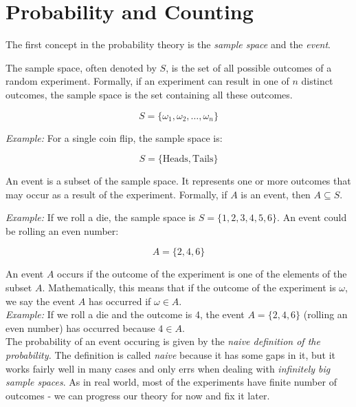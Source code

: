 \section{Probability and Counting}

The first concept in the probability theory is the \textit{sample space} and the \textit{event}. 

\begin{definition}
    The sample space, often denoted by \( S \), is the set of all possible outcomes of a random experiment. Formally, if an experiment can result in one of \( n \) distinct outcomes, the sample space is the set containing all these outcomes.

\[
S = \{ \omega_1, \omega_2, \dots, \omega_n \}
\]
\end{definition}


\textit{Example:} For a single coin flip, the sample space is:

\[
S = \{ \text{Heads}, \text{Tails} \}
\]

\begin{definition}
    An event is a subset of the sample space. It represents one or more outcomes that may occur as a result of the experiment. Formally, if \( A \) is an event, then \( A \subseteq S \).
\end{definition}

\textit{Example:} If we roll a die, the sample space is \( S = \{1, 2, 3, 4, 5, 6\} \). An event could be rolling an even number:

\[
A = \{2, 4, 6\}
\]

An event \( A \) occurs if the outcome of the experiment is one of the elements of the subset \( A \). Mathematically, this means that if the outcome of the experiment is \( \omega \), we say the event \( A \) has occurred if \( \omega \in A \). \\

\textit{Example:} If we roll a die and the outcome is 4, the event \( A = \{2, 4, 6\} \) (rolling an even number) has occurred because \( 4 \in A \). \\

The probability of an event occuring is given by the \textit{naive definition of the probability.} The definition is called \textit{naive} because it has some gaps in it, but it works fairly well in many cases and only errs when dealing with \textit{infinitely big sample spaces}. As in real world, most of the experiments have finite number of outcomes - we can progress our theory for now and fix it later. 

